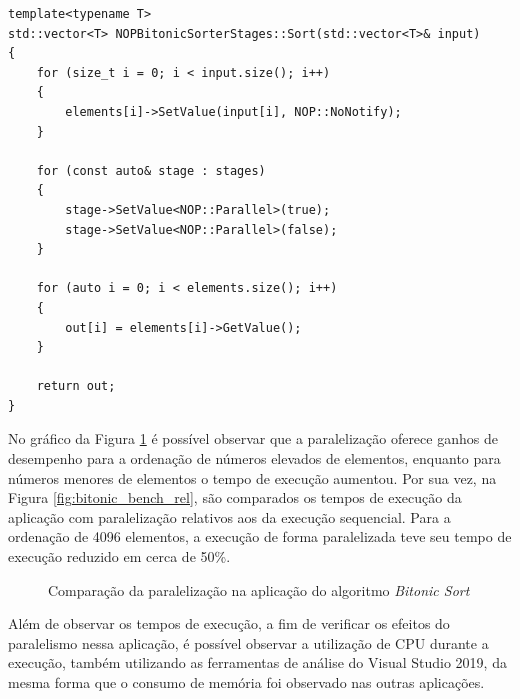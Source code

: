 \begin{lstlisting}[caption = {\textit{Bitonic Sort} paralelizado com o \textit{Framework} PON C++ 4.0},
  source = {Autoria própria}, float=htb,
  label = {cod:fn_sort_p},
]
template<typename T>
std::vector<T> NOPBitonicSorterStages::Sort(std::vector<T>& input)
{
    for (size_t i = 0; i < input.size(); i++)
    {
        elements[i]->SetValue(input[i], NOP::NoNotify);
    }

    for (const auto& stage : stages)
    {
        stage->SetValue<NOP::Parallel>(true);
        stage->SetValue<NOP::Parallel>(false);
    }

    for (auto i = 0; i < elements.size(); i++)
    {
        out[i] = elements[i]->GetValue();
    }

    return out;
}
\end{lstlisting}

No gráfico da Figura \ref{fig:bitonic_par} é possível observar que a
paralelização oferece ganhos de desempenho para a ordenação de números elevados
de elementos, enquanto para números menores de elementos o tempo de execução
aumentou. Por sua vez, na Figura \ref{fig:bitonic_bench_rel}, são comparados os
tempos de execução da aplicação com paralelização relativos aos da execução
sequencial. Para a ordenação de 4096 elementos, a execução de forma
paralelizada teve seu tempo de execução reduzido em cerca de 50\%. 

\begin{figure}[!htb]
\centering
{}
\caption{Comparação da paralelização na aplicação do algoritmo \textit{Bitonic
Sort}}
\label{fig:bitonic_par}
\end{figure}

Além de observar os tempos de execução, a fim de verificar os efeitos do
paralelismo nessa aplicação, é possível observar a utilização de CPU durante a
execução, também utilizando as ferramentas de análise do Visual Studio 2019, da
mesma forma que o consumo de memória foi observado nas outras aplicações. 

